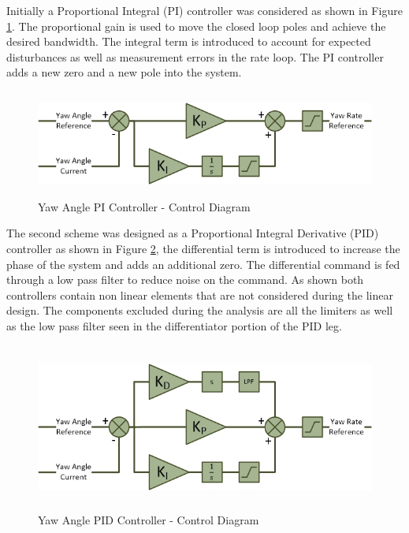 	Initially a Proportional Integral (PI) controller was considered as shown in Figure \ref{IM_YawAngleController}. The proportional gain is used to move the closed loop poles and achieve the desired bandwidth. The integral term is introduced to account for expected disturbances as well as measurement errors in the rate loop. The PI controller adds a new zero and a new pole into the system. 
	
	\begin{figure}[H]
		\centering
		\includegraphics[height = 3.5cm]{../References/Diagrams/YawAngleControllerPI.jpg}
		\caption{Yaw Angle PI Controller -  Control Diagram}
		\label{IM_YawAngleController}
	\end{figure}
	
	The second scheme was designed as a Proportional Integral Derivative (PID) controller as shown in Figure \ref{IM_YawAngleControllerPID}, the differential term is introduced to increase the phase of the system and adds an additional zero. The differential command is fed through a low pass filter to reduce noise on the command. As shown both controllers contain non linear elements that are not considered during the linear design. The components excluded during the analysis are all the limiters as well as the low pass filter seen in the differentiator portion of the PID leg.
	
	\begin{figure}[H]
		\centering
		\includegraphics[height = 5.5cm]{../References/Diagrams/YawAngleControllerPID.jpg}
		\caption{Yaw Angle PID Controller -  Control Diagram}
		\label{IM_YawAngleControllerPID}
	\end{figure}

